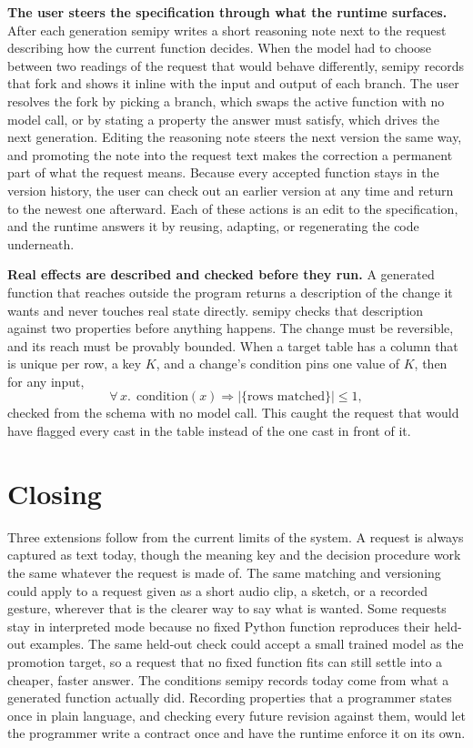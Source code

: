 \documentclass[9pt]{extarticle}
\begin{document}
\textbf{The user steers the specification through what the runtime surfaces.}
After each generation semipy writes a short reasoning note next to the request
describing how the current function decides. When the model had to choose
between two readings of the request that would behave differently, semipy
records that fork and shows it inline with the input and output of each
branch. The user resolves the fork by picking a branch, which swaps the
active function with no model call, or by stating a property the answer must
satisfy, which drives the next generation. Editing the reasoning note steers
the next version the same way, and promoting the note into the request text
makes the correction a permanent part of what the request means. Because every
accepted function stays in the version history, the user can check out an
earlier version at any time and return to the newest one afterward. Each of
these actions is an edit to the specification, and the runtime answers it by
reusing, adapting, or regenerating the code underneath.

\textbf{Real effects are described and checked before they run.} A generated
function that reaches outside the program returns a description of the change
it wants and never touches real state directly. semipy checks that description
against two properties before anything happens. The change must be reversible,
and its reach must be provably bounded. When a target table has a column that
is unique per row, a key $K$, and a change's condition pins one value of $K$,
then for any input,
\[
\forall\, x.\ \ \mathrm{condition}(x) \Rightarrow
|\{\text{rows matched}\}| \le 1,
\]
checked from the schema with no model call. This caught the request that would
have flagged every cast in the table instead of the one cast in front of it.

\section{Closing}

Three extensions follow from the current limits of the system. A request is
always captured as text today, though the meaning key and the decision
procedure work the same whatever the request is made of. The same matching and
versioning could apply to a request given as a short audio clip, a sketch, or
a recorded gesture, wherever that is the clearer way to say what is wanted.
Some requests stay in interpreted mode because no fixed Python function
reproduces their held-out examples. The same held-out check could accept a
small trained model as the promotion target, so a request that no fixed
function fits can still settle into a cheaper, faster answer. The conditions
semipy records today come from what a generated function actually did.
Recording properties that a programmer states once in plain language, and
checking every future revision against them, would let the programmer write a
contract once and have the runtime enforce it on its own.
\end{document}
